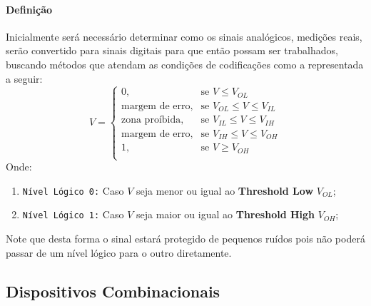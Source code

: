 \documentclass{article}
\begin{document}
                \paragraph{Definição}Inicialmente será necessário determinar como os sinais analógicos, medições reais, serão convertido para sinais digitais para que então possam ser trabalhados, buscando métodos que atendam as condições de codificações como a representada a seguir:
                    \begin{equation}
                        \boxed{
                            V = 
                            \begin{cases}
                                0,                      & \text{se } V \leq V_{OL}\\
                                \text{margem de erro},  & \text{se } V_{OL} \leq V \leq V_{IL}\\
                                \text{zona proíbida},   & \text{se } V_{IL} \leq V \leq V_{IH}\\
                                \text{margem de erro},  & \text{se } V_{IH} \leq V \leq V_{OH}\\
                                1,                      & \text{se } V \geq V_{OH}\\
                            \end{cases}
                        }
                    \end{equation}
                Onde:
                    \begin{enumerate}[noitemsep]
                        \item \texttt{Nível Lógico 0:} Caso $V$ seja menor ou igual ao \textbf{Threshold Low} $V_{OL}$;

                        \item \texttt{Nível Lógico 1:} Caso $V$ seja maior ou igual ao \textbf{Threshold High} $V_{OH}$;
                    \end{enumerate}
                Note que desta forma o sinal estará protegido de pequenos ruídos pois não poderá passar de um nível lógico para o outro diretamente.

        \subsection{Dispositivos Combinacionais}
\end{document}
